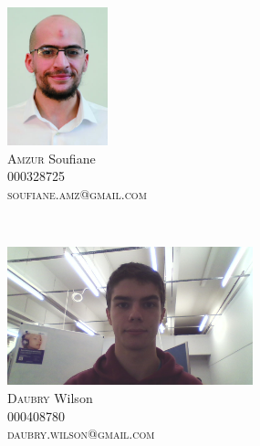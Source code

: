 \documentclass[11pt,a4paper,11pt]{report}
\begin{document}
\begin{minipage}{0.45\textwidth}
\begin{flushleft} 
\includegraphics[height=4cm] {photos_membres/Soufiane.jpg}\\
\textsc{Amzur} Soufiane\\
\textsc{000328725}\\
\textsc{soufiane.amz@gmail.com}\\
\end{flushleft}
\end{minipage}
~
\begin{minipage}{0.45\textwidth}
\begin{flushright}
\includegraphics[height=4cm]{photos_membres/Wilson.jpg}\\
\textsc{Daubry} Wilson\\
\textsc{000408780}\\
\textsc{daubry.wilson@gmail.com}\\
\end{flushright}
\end{minipage}

\emph{} \\
\emph{} \\
\emph{} \\
\emph{} \\
\emph{} \\
\end{document}
